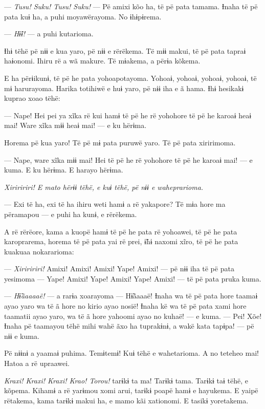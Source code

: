 --- \textit{Tusu! Suku! Tusu! Suku!} --- Pë amixi kõo ha, të pë pata tamama.
Ɨnaha të pë pata kuɨ ha, a puhi moyawërayoma. No ɨhɨpɨrema. 

--- \textit{Hɨ̃ɨ! }--- a puhi kutarioma. 

Ɨhɨ tëhë pë nɨɨ e kua yaro, pë nɨɨ e rërëkema. Të mɨɨ makui, të pë pata
tapraɨ haɨonomi. Ihiru rë a wã makure. Të mɨakema, a përɨa kõkema.

E ha përɨikunɨ, të pë he pata yohoapotayoma. Yohoaɨ, yohoaɨ, yohoaɨ,
yohoaɨ, të mɨ harurayoma. Harika totihiwë e huɨ yaro, pë nɨɨ iha e ã
hama. Ɨhɨ hesikakɨ kuprao xoao tëhë:

--- Nape! Hei pei ya xĩka rë kui hamɨ të pë he rë yohohore të pë he
karoaɨ heaɨ mai! Ware xĩka mɨɨ heaɨ mai! --- e ku hërɨma. 

Horema pë kua yaro! Të pë mɨ pata puruwë yaro. Të pë pata xiririmoma. 

--- Nape, ware xĩka mɨɨ mai! Hei të pë he rë yohohore të pë he karoaɨ
mai! --- e kuma. E ku hërɨma. E harayo hërɨma. 

\textit{Xiriririri! E mato hërɨɨ tëhë, e kuɨ tëhë, pë nɨɨ e waheprarioma.} 

--- Exi të ha, exi të ha ihiru weti hamɨ a rë yakapore? Të mɨa hore ma
përamapou --- e puhi ha kunɨ, e rërëkema. 

A rë rërëore, kama a kuopë hamɨ të pë he pata rë yohoawei, të pë he pata
karoprarema, horema të pë pata yai rë prei, ɨ̃hɨ naxomi xĩro, të pë he
pata kuakuaa nokararioma:

--- \textit{Xiriririri!} Amixi! Amixi! Amixi! Yape! Amixi! --- pë nɨɨ iha të pë
pata yesimoma --- Yape! Amixi! Yape! Amixi! Yape! Amixi! --- të pë pata
pruka kuma. 

--- \textit{Hɨ̃ãaaaaë! }--- a rarɨa xoarayoma --- Hɨ̃ãaaaë! Ɨnaha wa të pë pata
 hore taamaɨ ayao yaro wa të ã hore no kirio ayao nosië! Ɨnaha kë wa të
 pë pata xami hore taamatii ayao yaro, wa të ã hore yahoomi ayao no
 kuhaë! --- e kuma. --- Pei! Xõe! Ɨnaha pë taamayou tëhë mihi wahë ãxo ha
 tuprakɨnɨ, a wakë kata tapɨpa! --- pë nɨɨ e kuma. 

Pë nɨɨnɨ a yaamaɨ puhima. Temɨtemɨ! Kuɨ tëhë e wahetarioma. A no teteheo
mai! Hatoa a rë upraawei. 

\textit{Kraxi! Kraxi! Kraxi! Krao! Torou!} tarɨkɨ ta ma! Tarɨkɨ tama. Tarɨkɨ taɨ
tëhë, e kõpema. Kihamɨ a rë yarɨmou xomi arui, tarɨkɨ poapë hamɨ e
hayukema. E yaipë rëtakema, kama tarɨkɨ makui ha, e mamo kãi xationomi.
E tasikɨ yoretakema. 

